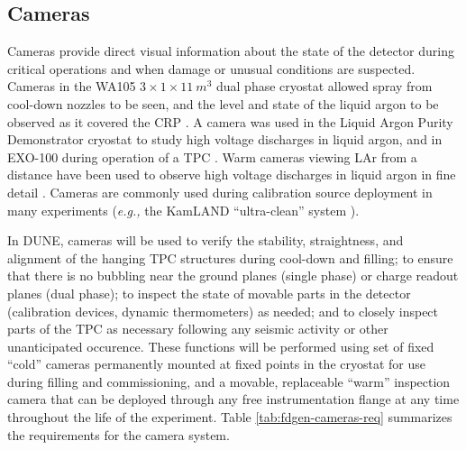 \subsection{Cameras}
\label{sec:fdgen-slow-cryo-cameras}

Cameras provide direct visual information about the state of the
detector during critical operations and when damage or unusual
conditions are suspected.  Cameras in the WA105 \(3\times 1\times
1\SI{1}{m^3}\) dual phase cryostat allowed spray from cool-down
nozzles to be seen, and the level and state of the liquid argon to be
observed as it covered the CRP \cite{Murphy:20170516}.  A camera was
used in the Liquid Argon Purity Demonstrator
cryostat\cite{Adamowski:2014daa} to study high voltage discharges in
liquid argon, and in EXO-100 during operation of a TPC
\cite{Delaquis:2013hva}.  Warm cameras viewing LAr from a distance
have been used to observe high voltage discharges in liquid argon in
fine detail \cite{Auger:2015xlo}.  Cameras are commonly used during
calibration source deployment in many experiments ({\em e.g.,} the
KamLAND ``ultra-clean'' system \cite{Banks:2014hra}).

In DUNE, cameras will be used to verify the stability, straightness,
and alignment of the hanging TPC structures during cool-down and
filling; to ensure that there is no bubbling near the ground planes
(single phase) or charge readout planes (dual phase); to inspect the
state of movable parts in the detector (calibration devices, dynamic
thermometers) as needed; and to closely inspect parts of the TPC as
necessary following any seismic activity or other unanticipated
occurence.  These functions will be performed using set of fixed
``cold'' cameras permanently mounted at fixed points in the cryostat
for use during filling and commissioning, and a movable, replaceable
``warm'' inspection camera that can be deployed through any free
instrumentation flange at any time throughout the life of the
experiment.  Table \ref{tab:fdgen-cameras-req} summarizes the
requirements for the camera system.

